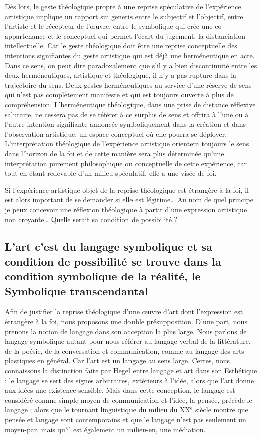 Dès lors, le geste théologique propre à une reprise spéculative de l’expérience artistique implique un rapport sui generis entre le subjectif et l’objectif, entre l’artiste et le récepteur de l’œuvre, entre le symbolique qui crée une co-appartenance et le conceptuel qui permet l’écart du jugement, la distanciation intellectuelle. Car le geste théologique doit être une reprise conceptuelle des intentions signifiantes du geste artistique qui est déjà une herméneutique en acte. Dans ce sens, on peut dire paradoxalement que s’il y a bien discontinuité entre les deux herméneutiques, artistique et théologique, il n’y a pas rupture dans la trajectoire du sens. Deux gestes herméneutiques au service d’une réserve de sens qui n’est pas complètement manifeste et qui est toujours ouverte à plus de compréhension. L’herméneutique théologique, dans une prise de distance réflexive salutaire, ne cessera pas de se référer à ce surplus de sens et offrira à l’une ou à l’autre intention signifiante annoncée symboliquement dans la création et dans l’observation artistique, un espace conceptuel où elle pourra se déployer. L’interprétation théologique de l’expérience artistique orientera toujours le sens dans l’horizon de la foi et de cette manière sera plus déterminée qu’une interprétation purement philosophique ou conceptuelle de cette expérience, car tout en étant redevable d’un milieu spéculatif, elle a une visée de foi.

Si l’expérience artistique objet de la reprise théologique est étrangère à la foi, il est alors important de se demander si elle est légitime… Au nom de quel principe je peux concevoir une réflexion théologique à partir d’une expression artistique non croyante… Quelle serait sa condition de possibilité ?

\subsection{L’art c’est du langage symbolique et sa condition de possibilité se trouve dans la condition symbolique de la réalité, le Symbolique transcendantal}

Afin de justifier la reprise théologique d’une œuvre d’art dont l’expression est étrangère à la foi, nous proposons une double présupposition. D’une part, nous prenons la notion de langage dans son acception la plus large. Nous parlons de langage symbolique autant pour nous référer au langage verbal de la littérature, de la poésie, de la conversation et communication, comme au langage des arts plastiques en général. Car l’art est un langage au sens large. Certes, nous connaissons la distinction faite par Hegel entre langage et art dans son Esthétique : le langage se sert des signes arbitraires, extérieurs à l’idée, alors que l’art donne aux idées une existence sensible. Mais dans cette conception, le langage est considéré comme simple moyen de communication et l’idée, la pensée, précède le langage ; alors que le tournant linguistique du milieu du {\footnotesize XX}$^\text{e}$ siècle montre que pensée et langage sont contemporains et que le langage n’est pas seulement un moyen-par, mais qu’il est également un milieu-en, une médiation.

